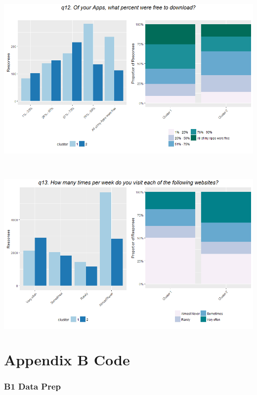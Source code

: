 \documentclass[]{article}
\begin{document}
~

\includegraphics[width=6.25000in]{images/barplot_q12.recat.png}

~

\includegraphics[width=6.25000in]{images/barplot_q13r1.png}

\newpage

\section{Appendix B Code}\label{appendix-b-code}

\subsubsection{B1 Data Prep}\label{b1-data-prep}
\end{document}
